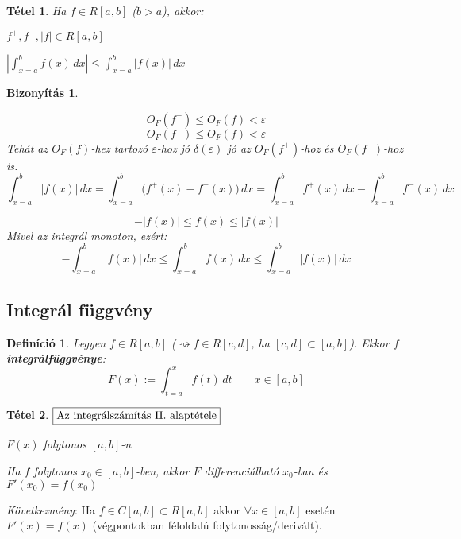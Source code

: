 \documentclass[a4paper,12pt,twoside]{book}
\newtheorem{tetel}{Tétel}[chapter]
\newtheorem{defi}{Definíció}[chapter]
\theoremstyle{break}
\newtheorem{biz}{Bizonyítás}[chapter]
\theoremstyle{plain}
\newcommand{\hatInteg}[3]{\ensuremath{\int^{#2}_{x=#1} #3\, dx}}
\newcommand{\intfv}[3]{\ensuremath{\int^{#2}_{t=#1} #3\, dt}}
\begin{document}
\begin{tetel}
 Ha $f\in R[a,b]$ ($b>a$), akkor:
\begin{enumerate*}
 \item $f^+, f^-, |f| \in R[a,b]$
 \item $\displaystyle\left|\hatInteg{a}{b}{f(x)}\right| \leqslant \hatInteg{a}{b}{\Big|f(x)\Big|}$
\end{enumerate*}
\end{tetel}
\begin{biz}
 \begin{enumerate*}
 \item \[O_F(f^+) \leqslant O_F(f) < \varepsilon\]
       \[O_F(f^-) \leqslant O_F(f) < \varepsilon\]
      Tehát az $O_F(f)$-hez tartozó $\varepsilon$-hoz jó $\delta(\varepsilon)$ jó az $O_F(f^+)$-hoz és $O_F(f^-)$-hoz is.
  \[\hatInteg{a}{b}{|f(x)|} = \hatInteg{a}{b}{\Big(f^+(x)-f^-(x)\Big)} = \hatInteg{a}{b}{f^+(x)}-\hatInteg{a}{b}{f^-(x)}\]
 \item \[-|f(x)| \leqslant f(x) \leqslant |f(x)|\]
  Mivel az integrál monoton, ezért:
  \[-\hatInteg{a}{b}{|f(x)|} \leqslant \hatInteg{a}{b}{f(x)} \leqslant \hatInteg{a}{b}{|f(x)|}\]
\end{enumerate*}
\end{biz}

\subsection{Integrál függvény}

\begin{defi}
 Legyen $f\in R[a,b]$ ($\rightsquigarrow f\in R[c,d]$, ha $[c,d]\subset [a,b]$). Ekkor $f$ \textbf{integrálfüggvénye}:
  \[F(x) := \intfv{a}{x}{f(t)} \qquad x\in[a,b]\]
\end{defi}

\begin{tetel} $\boxed{$Az integrálszámítás II. alaptétele$}$
 \begin{enumerate*}
  \item $F(x)$ folytonos $[a,b]$-n
  \item Ha $f$ folytonos $x_0\in[a,b]$-ben, akkor $F$ differenciálható $x_0$-ban és $F'(x_0)=f(x_0)$
 \end{enumerate*}
\end{tetel}
\emph{Következmény}: Ha $f\in C[a,b]\subset R[a,b]$ akkor $\forall x\in [a,b]$ esetén $F'(x)=f(x)$ (végpontokban féloldalú folytonosság/derivált).
\end{document}
